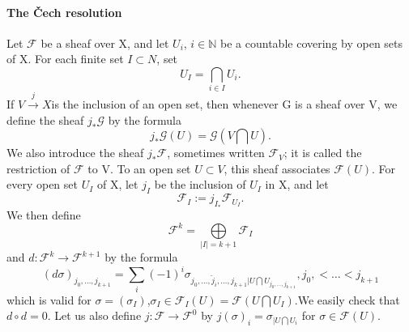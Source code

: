 \documentclass{article}
\numberwithin{equation}{subsection} %
\theoremstyle{definition}
\begin{document}
\paragraph{The \v{C}ech resolution}
Let $\mathcal{F}$ be a sheaf over X, and let $U_i$, $i\in \mathbb{N}$ be a countable covering by open
sets of X. For each finite set $I \subset N$, set
\[
U_I=\bigcap_{i\in I}U_i.
\]
If $V\overset{j}{\to}X$is the inclusion of an open set, then whenever G is a sheaf over V,
we define the sheaf $j_\ast \mathcal G$ by the formula
\[
j_\ast \mathcal G(U)=\mathcal G(V\bigcap U).
\]
We also introduce the sheaf $j_\ast \mathcal F$, sometimes written $\mathcal F_V$; it is called the restriction
of $\mathcal F$ to V. To an open set $U \subset V$, this sheaf associates $\mathcal F(U)$. For every
open set $U_I$ of X, let $j_I$ be the inclusion of $U_I$ in X, and let
\[
\mathcal F_I := j_{I_\ast}\mathcal F_{U_I}.
\]
We then define
\[
\mathcal F^k =\bigoplus \limits_{|I|=k+1}\mathcal F_I
\]
and $d : \mathcal F^k \to \mathcal F^{k+1}$ by the formula
\[
(d\sigma)_{j_0,\dots,j_{k+1}}=\sum \limits_ i (-1)^i \sigma_{j_0,\dots,\check{j}_i,\dots,j_{k+1}|U\bigcap U_{j_0,\dots,j_{k+1}}},j_0,<\dots<j_{k+1}
\]
which is valid for $\sigma=(\sigma _I)$,$\sigma _I\in \mathcal F_I(U)=\mathcal F(U \bigcap U_I)$.We easily check
that $d \circ d = 0$. Let us also define $j : \mathcal F \to \mathcal F^0$ by $j(\sigma)_i = \sigma_{|U\bigcap U_i}$ for $\sigma \in \mathcal F(U)$.
\end{document}
